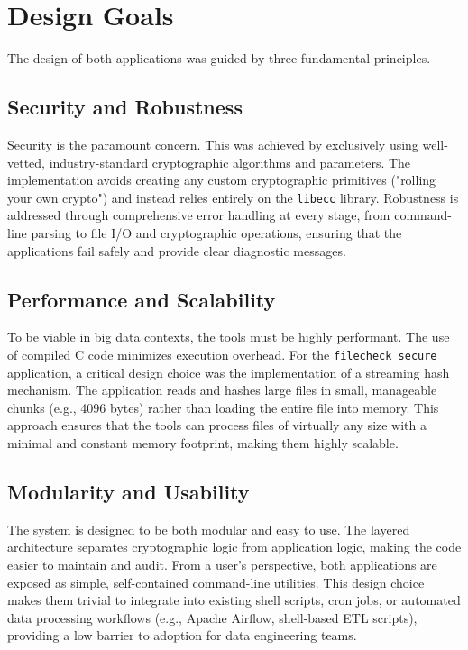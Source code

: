 \section{Design Goals}
The design of both applications was guided by three fundamental principles.

\subsection{Security and Robustness}
Security is the paramount concern. This was achieved by exclusively using well-vetted, industry-standard cryptographic algorithms and parameters. The implementation avoids creating any custom cryptographic primitives ("rolling your own crypto") and instead relies entirely on the \texttt{libecc} library. Robustness is addressed through comprehensive error handling at every stage, from command-line parsing to file I/O and cryptographic operations, ensuring that the applications fail safely and provide clear diagnostic messages.

\subsection{Performance and Scalability}
To be viable in big data contexts, the tools must be highly performant. The use of compiled C code minimizes execution overhead. For the \texttt{filecheck\_secure} application, a critical design choice was the implementation of a streaming hash mechanism. The application reads and hashes large files in small, manageable chunks (e.g., 4096 bytes) rather than loading the entire file into memory. This approach ensures that the tools can process files of virtually any size with a minimal and constant memory footprint, making them highly scalable.

\subsection{Modularity and Usability}
The system is designed to be both modular and easy to use. The layered architecture separates cryptographic logic from application logic, making the code easier to maintain and audit. From a user's perspective, both applications are exposed as simple, self-contained command-line utilities. This design choice makes them trivial to integrate into existing shell scripts, cron jobs, or automated data processing workflows (e.g., Apache Airflow, shell-based ETL scripts), providing a low barrier to adoption for data engineering teams.

